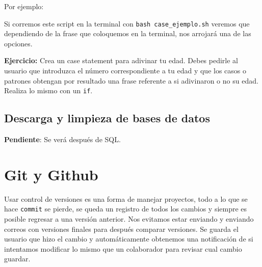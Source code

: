 \documentclass[
]{book}
\newenvironment{Shaded}{\begin{snugshade}}{\end{snugshade}}
\newcommand{\BuiltInTok}[1]{#1}
\newcommand{\CommentTok}[1]{\textcolor[rgb]{0.56,0.35,0.01}{\textit{#1}}}
\newcommand{\ControlFlowTok}[1]{\textcolor[rgb]{0.13,0.29,0.53}{\textbf{#1}}}
\newcommand{\KeywordTok}[1]{\textcolor[rgb]{0.13,0.29,0.53}{\textbf{#1}}}
\newcommand{\PreprocessorTok}[1]{\textcolor[rgb]{0.56,0.35,0.01}{\textit{#1}}}
\newcommand{\SpecialStringTok}[1]{\textcolor[rgb]{0.31,0.60,0.02}{#1}}
\newcommand{\StringTok}[1]{\textcolor[rgb]{0.31,0.60,0.02}{#1}}
\newcommand{\VariableTok}[1]{\textcolor[rgb]{0.00,0.00,0.00}{#1}}
\begin{document}
Por ejemplo:

\begin{Shaded}
\end{Shaded}

Si corremos este script en la terminal con \texttt{bash\ case\_ejemplo.sh} veremos que dependiendo de la frase que coloquemos en la terminal, nos arrojará una de las opciones.

\textbf{Ejercicio:} Crea un case statement para adivinar tu edad. Debes pedirle al usuario que introduzca el número correspondiente a tu edad y que los casos o patrones obtengan por resultado una frase referente a si adivinaron o no su edad. Realiza lo mismo con un \texttt{if}.

\hypertarget{descarga-y-limpieza-de-bases-de-datos}{%
\section{Descarga y limpieza de bases de datos}\label{descarga-y-limpieza-de-bases-de-datos}}

\textbf{Pendiente}: Se verá después de SQL.

\hypertarget{git-y-github}{%
\chapter{Git y Github}\label{git-y-github}}

Usar control de versiones es una forma de manejar proyectos, todo a lo que se hace \texttt{commit} se pierde, se queda un registro de todos los cambios y siempre es posible regresar a una versión anterior. Nos evitamos estar enviando y enviando correos con versiones finales para después comparar versiones. Se guarda el usuario que hizo el cambio y automáticamente obtenemos una notificación de si intentamos modificar lo mismo que un colaborador para revisar cual cambio guardar.
\end{document}
